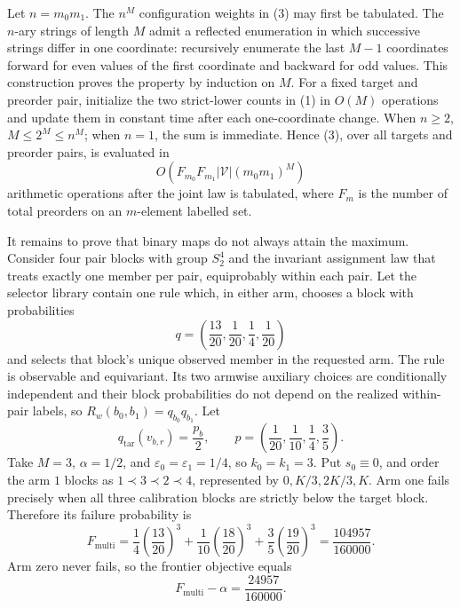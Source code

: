 Let \(n=m_0m_1\). The \(n^M\) configuration weights in (3) may first be tabulated. The \(n\)-ary strings of length \(M\) admit a reflected enumeration in which successive strings differ in one coordinate: recursively enumerate the last \(M-1\) coordinates forward for even values of the first coordinate and backward for odd values. This construction proves the property by induction on \(M\). For a fixed target and preorder pair, initialize the two strict-lower counts in (1) in \(O(M)\) operations and update them in constant time after each one-coordinate change. When \(n\ge2\), \(M\le2^M\le n^M\); when \(n=1\), the sum is immediate. Hence (3), over all targets and preorder pairs, is evaluated in
\[
O\!\left(F_{m_0}F_{m_1}|\mathcal V|(m_0m_1)^M\right)
\tag{4}
\]
arithmetic operations after the joint law is tabulated, where \(F_m\) is the number of total preorders on an \(m\)-element labelled set.

It remains to prove that binary maps do not always attain the maximum. Consider four pair blocks with group \(S_2^4\) and the invariant assignment law that treats exactly one member per pair, equiprobably within each pair. Let the selector library contain one rule which, in either arm, chooses a block with probabilities
\[
q=\left(\frac{13}{20},\frac1{20},\frac14,\frac1{20}\right)
\]
and selects that block's unique observed member in the requested arm. The rule is observable and equivariant. Its two armwise auxiliary choices are conditionally independent and their block probabilities do not depend on the realized within-pair labels, so \(R_w(b_0,b_1)=q_{b_0}q_{b_1}\). Let
\[
q_{\mathrm{tar}}(v_{b,r})=\frac{p_b}{2},\qquad p=\left(\frac1{20},\frac1{10},\frac14,\frac35\right).
\]
Take \(M=3\), \(\alpha=1/2\), and \(\varepsilon_0=\varepsilon_1=1/4\), so \(k_0=k_1=3\). Put \(s_0\equiv0\), and order the arm \(1\) blocks as \(1\prec3\prec2\prec4\), represented by \(0,K/3,2K/3,K\). Arm one fails precisely when all three calibration blocks are strictly below the target block. Therefore its failure probability is
\[
F_{\mathrm{multi}}=\frac14\left(\frac{13}{20}\right)^3+\frac1{10}\left(\frac{18}{20}\right)^3+\frac35\left(\frac{19}{20}\right)^3=\frac{104957}{160000}.
\tag{5}
\]
Arm zero never fails, so the frontier objective equals
\[
F_{\mathrm{multi}}-\alpha=\frac{24957}{160000}.
\tag{6}
\]

